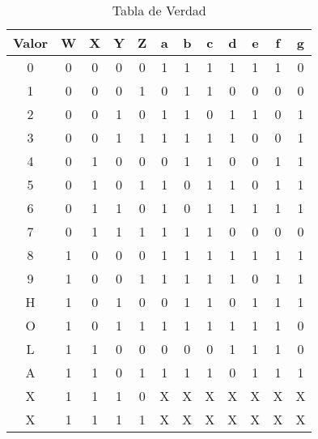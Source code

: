   \begin{table}[H]
    \begin{center}
      \begin{tabular}{ c ||| c  c  c  c ||| c | c | c | c | c | c | c}
        \toprule
        Valor & W & X & Y & Z & a & b & c & d & e & f & g \\
        \toprule
        0    &    0 & 0 & 0 & 0    &    1 & 1 & 1 & 1 & 1 & 1 & 0 \\
        1    &    0 & 0 & 0 & 1    &    0 & 1 & 1 & 0 & 0 & 0 & 0 \\
        2    &    0 & 0 & 1 & 0    &    1 & 1 & 0 & 1 & 1 & 0 & 1 \\
        3    &    0 & 0 & 1 & 1    &    1 & 1 & 1 & 1 & 0 & 0 & 1 \\
        \midrule
        4    &    0 & 1 & 0 & 0    &    0 & 1 & 1 & 0 & 0 & 1 & 1 \\
        5    &    0 & 1 & 0 & 1    &    1 & 0 & 1 & 1 & 0 & 1 & 1 \\
        6    &    0 & 1 & 1 & 0    &    1 & 0 & 1 & 1 & 1 & 1 & 1 \\
        7    &    0 & 1 & 1 & 1    &    1 & 1 & 1 & 0 & 0 & 0 & 0 \\
        \midrule
        8    &    1 & 0 & 0 & 0    &    1 & 1 & 1 & 1 & 1 & 1 & 1 \\
        9    &    1 & 0 & 0 & 1    &    1 & 1 & 1 & 1 & 0 & 1 & 1 \\
        H    &    1 & 0 & 1 & 0    &    0 & 1 & 1 & 0 & 1 & 1 & 1 \\
        O    &    1 & 0 & 1 & 1    &    1 & 1 & 1 & 1 & 1 & 1 & 0 \\
        \midrule
        L    &    1 & 1 & 0 & 0    &    0 & 0 & 0 & 1 & 1 & 1 & 0 \\
        A    &    1 & 1 & 0 & 1    &    1 & 1 & 1 & 0 & 1 & 1 & 1 \\
        X    &    1 & 1 & 1 & 0    &    X & X & X & X & X & X & X \\
        X    &    1 & 1 & 1 & 1    &    X & X & X & X & X & X & X \\
        \bottomrule
      \end{tabular}
      \label{tab:verdad}
      \caption{Tabla de Verdad}
    \end{center}
  \end{table}


